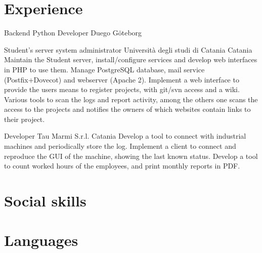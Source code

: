 \documentclass[11pt,a4paper,sans]{moderncv} %
\begin{document}
\section{Experience}

    {Backend Python Developer}
    {Duego}
    {G\"{o}teborg}
    {}
    {}

    {Student's server system administrator}
    {Universit\`{a} degli studi di Catania}
    {Catania}
    {}
    {Maintain the Student server, install/configure services and develop web interfaces in PHP to use them.
    \newline
    Manage PostgreSQL database, mail service (Postfix+Dovecot) and webserver (Apache 2).
    \newline
    Implement a web interface to provide the users means to register projects, with git/svn access and a wiki.
    \newline
    Various tools to scan the logs and report activity, among the others one scans the access to the projects and notifies the owners of which websites contain links to their project.}


    {Developer}
    {Tau Marmi S.r.l.}
    {Catania}
    {}
    {Develop a tool to connect with industrial machines and periodically store the log. Implement a client to connect and reproduce the GUI of the machine, showing the last known status.
    \newline
    Develop a tool to count worked hours of the employees, and print monthly reports in PDF.}


\section{Social skills}




\section{Languages}
\end{document}
